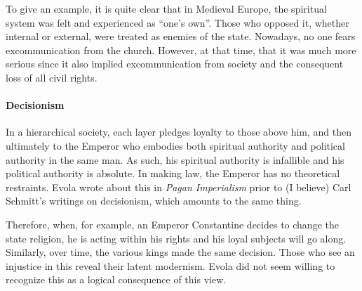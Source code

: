 To give an example, it is quite clear that in Medieval Europe, the spiritual system was felt and experienced as ``one's own''. Those who opposed it, whether internal or external, were treated as enemies of the state. Nowadays, no one fears excommunication from the church. However, at that time, that it was much more serious since it also implied excommunication from society and the consequent loss of all civil rights.

\paragraph{Decisionism}


In a hierarchical society, each layer pledges loyalty to those above him, and then ultimately to the Emperor who embodies both spiritual authority and political authority in the same man. As such, his spiritual authority is infallible and his political authority is absolute. In making law, the Emperor has no theoretical restraints. Evola wrote about this in \emph{Pagan Imperialism} prior to (I believe) Carl Schmitt's writings on decisionism, which amounts to the same thing.

Therefore, when, for example, an Emperor Constantine decides to change the state religion, he is acting within his rights and his loyal subjects will go along. Similarly, over time, the various kings made the same decision. Those who see an injustice in this reveal their latent modernism. Evola did not seem willing to recognize this as a logical consequence of this view.



